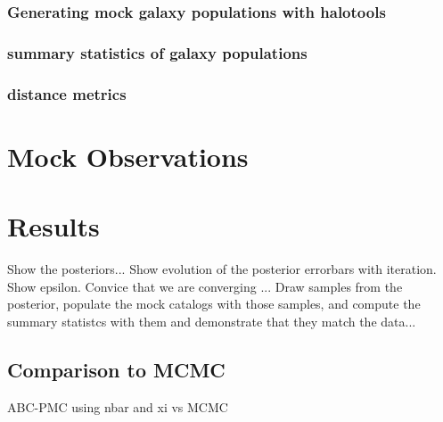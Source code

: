 \subsubsection{Generating mock galaxy populations with halotools}




\subsubsection{summary statistics of galaxy populations}


\subsubsection{distance metrics}




\section{Mock Observations}\label{sec:data}

\section{Results}\label{sec:results}
Show the posteriors...
Show evolution of the posterior errorbars with iteration. Show epsilon. Convice that we are converging ...
Draw samples from the posterior, populate the mock catalogs with those samples, and compute the summary statistcs with them 
and demonstrate that they match the data...

\subsection{Comparison to MCMC}
ABC-PMC using nbar and xi vs MCMC

